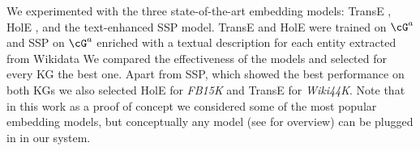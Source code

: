 We experimented with the three state-of-the-art embedding models: %
TransE \cite{Bordes:NIPS2013}, HolE \cite{DBLP:conf/aaai/NickelRP16}, and the text-enhanced SSP \cite{DBLP:conf/aaai/0005HMZ17} model. 
TransE and HolE were trained on $\cG^a$ and SSP on $\cG^a$ enriched with %
%
a textual description for each entity extracted from Wikidata %
We compared the %
effectiveness of the models and selected for every KG %
the best one. Apart from SSP, which showed the best performance on both KGs we also selected %
HolE for \textit{FB15K} and TransE for \textit{Wiki44K}. %
Note that in this work as a proof of concept we considered some of the most popular embedding models, but %
conceptually any model (see \cite{DBLP:journals/tkde/WangMWG17} for overview) can be plugged in in our system. %


